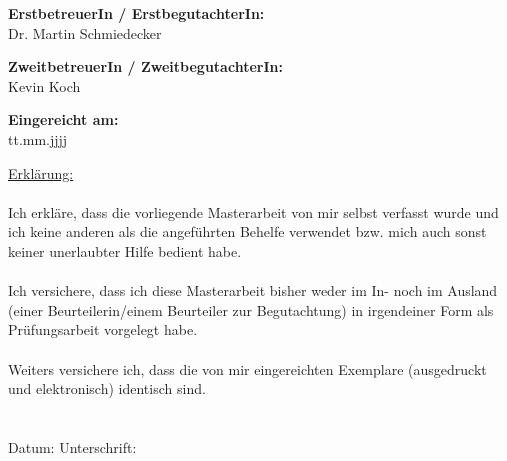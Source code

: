 \begin{center}
\vspace{0.7cm}

\hspace*{-1.0cm} \textbf{ErstbetreuerIn / ErstbegutachterIn:} \\
\vspace{0.2cm}
\hspace*{-1.0cm} Dr. Martin Schmiedecker \\

\vspace{0.7cm}

\hspace*{-1.0cm} \textbf{ZweitbetreuerIn / ZweitbegutachterIn:} \\
\vspace{0.2cm}
\hspace*{-1.0cm} Kevin Koch \\


\vspace{0.7cm}

\hspace*{-1.0cm} \textbf{Eingereicht am:} \\
\vspace{0.2cm}
\hspace*{-1.0cm} tt.mm.jjjj \\

\end{center}

\newpage

\pagestyle{empty}

\vspace*{15.6cm}

\hspace*{-0.7cm} \underline{Erklärung:}\\\\
Ich erkläre, dass die vorliegende Masterarbeit von mir selbst verfasst wurde und ich keine anderen als die angeführten Behelfe verwendet bzw. mich auch sonst keiner unerlaubter Hilfe bedient habe.\\\\
Ich versichere, dass ich diese Masterarbeit bisher weder im In- noch im Ausland (einer Beurteilerin/einem Beurteiler zur Begutachtung) in irgendeiner Form als Prüfungsarbeit vorgelegt habe.\\\\
Weiters versichere ich, dass die von mir eingereichten Exemplare (ausgedruckt und elektronisch) identisch sind.
\\\\\\
Datum: \hspace{6cm} Unterschrift:\\






